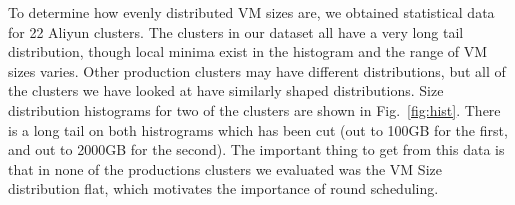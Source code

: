 To determine how evenly distributed VM sizes are, we obtained statistical data
for 22 Aliyun clusters. The clusters in our dataset all have a very long tail
distribution, though local minima exist in the histogram and the range of VM
sizes varies. Other production clusters may have different distributions, but
all of the clusters we have looked at have similarly shaped distributions. Size
distribution histograms for two of the clusters are shown in
Fig.~\ref{fig:hist}. There is a long tail on both histrograms which has been
cut (out to 100GB for the first, and out to 2000GB for the second). The
important thing to get from this data is that in none of the productions
clusters we evaluated was the VM Size distribution flat, which motivates the
importance of round scheduling.



